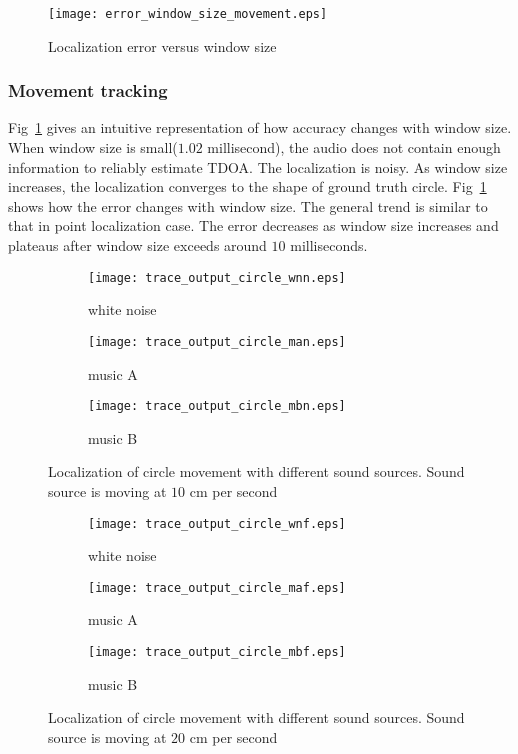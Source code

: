 \begin{figure}[]
\texttt{[image: error\_window\_size\_movement.eps]}
\caption{Localization error versus window size}
\label{fig:err_win_circle}
\end{figure}

\subsubsection{Movement tracking}

Fig~\ref{fig:err_win_circle} gives an intuitive representation of how accuracy changes with window size. When window size is small($1.02$ millisecond), the audio does not contain enough information to reliably estimate TDOA. The localization is noisy. As window size increases, the localization converges to the shape of ground truth circle. Fig~\ref{fig:err_win_circle} shows how the error changes with window size. The general trend is similar to that in point localization case. The error decreases as window size increases and plateaus after window size exceeds around $10$ milliseconds.

\begin{figure*}[]
\centering
\begin{subfigure}[]{1.0\textwidth}
  \texttt{[image: trace\_output\_circle\_wnn.eps]}
  \caption{white noise}
  \label{fig:circle_wnn}
\end{subfigure}
\begin{subfigure}[]{1.0\textwidth}
  \texttt{[image: trace\_output\_circle\_man.eps]}
  \caption{music A}
  \label{fig:circle_musican}
\end{subfigure}
\begin{subfigure}[]{1.0\textwidth}
  \texttt{[image: trace\_output\_circle\_mbn.eps]}
  \caption{music B}
  \label{fig:circle_musicbn}
\end{subfigure}
\caption{Localization of circle movement with different sound sources. Sound source is moving at $10$ cm per second}
\label{fig:circle_normal}
\end{figure*}

\begin{figure*}[]
\centering
\begin{subfigure}[]{1.0\textwidth}
  \texttt{[image: trace\_output\_circle\_wnf.eps]}
  \caption{white noise}
  \label{fig:circle_wnf}
\end{subfigure}
\begin{subfigure}[]{1.0\textwidth}
  \texttt{[image: trace\_output\_circle\_maf.eps]}
  \caption{music A}
  \label{fig:circle_musicaf}
\end{subfigure}
\begin{subfigure}[]{1.0\textwidth}
  \texttt{[image: trace\_output\_circle\_mbf.eps]}
  \caption{music B}
  \label{fig:circle_musicbf}
\end{subfigure}
\caption{Localization of circle movement with different sound sources. Sound source is moving at $20$ cm per second}
\label{fig:circle_fast}
\end{figure*}

